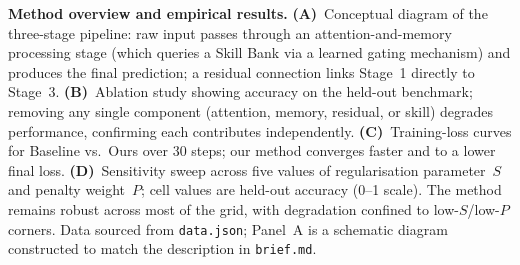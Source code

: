 \caption{\textbf{Method overview and empirical results.}
\textbf{(A)}~Conceptual diagram of the three-stage pipeline: raw input passes through an attention-and-memory processing stage (which queries a Skill Bank via a learned gating mechanism) and produces the final prediction; a residual connection links Stage~1 directly to Stage~3.
\textbf{(B)}~Ablation study showing accuracy on the held-out benchmark; removing any single component (attention, memory, residual, or skill) degrades performance, confirming each contributes independently.
\textbf{(C)}~Training-loss curves for Baseline vs.\ Ours over 30 steps; our method converges faster and to a lower final loss.
\textbf{(D)}~Sensitivity sweep across five values of regularisation parameter~$S$ and penalty weight~$P$; cell values are held-out accuracy (0--1 scale). The method remains robust across most of the grid, with degradation confined to low-$S$/low-$P$ corners. Data sourced from \texttt{data.json}; Panel~A is a schematic diagram constructed to match the description in \texttt{brief.md}.}
